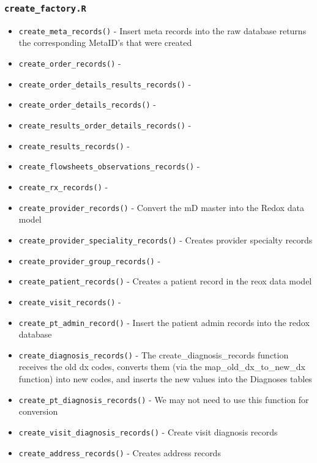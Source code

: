 \documentclass[
]{book}
\providecommand{\tightlist}{%
  \setlength{\itemsep}{0pt}\setlength{\parskip}{0pt}}
\begin{document}
\hypertarget{create_factory.r}{%
\subsubsection{\texorpdfstring{\texttt{create\_factory.R}}{create\_factory.R}}\label{create_factory.r}}

\begin{itemize}
\tightlist
\item
  \texttt{create\_meta\_records()} - Insert meta records into the raw database returns the corresponding MetaID's that were created
\item
  \texttt{create\_order\_records()} -
\item
  \texttt{create\_order\_details\_results\_records()} -
\item
  \texttt{create\_order\_details\_records()} -
\item
  \texttt{create\_results\_order\_details\_records()} -
\item
  \texttt{create\_results\_records()} -
\item
  \texttt{create\_flowsheets\_observations\_records()} -
\item
  \texttt{create\_rx\_records()} -
\item
  \texttt{create\_provider\_records()} - Convert the mD master into the Redox data model
\item
  \texttt{create\_provider\_speciality\_records()} - Creates provider specialty records
\item
  \texttt{create\_provider\_group\_records()} -
\item
  \texttt{create\_patient\_records()} - Creates a patient record in the reox data model
\item
  \texttt{create\_visit\_records()} -
\item
  \texttt{create\_pt\_admin\_record()} - Insert the patient admin records into the redox database
\item
  \texttt{create\_diagnosis\_records()} - The create\_diagnosis\_records function receives the old dx codes, converts them (via the map\_old\_dx\_to\_new\_dx function) into new codes, and inserts the new values into the Diagnoses tables
\item
  \texttt{create\_pt\_diagnosis\_records()} - We may not need to use this function for conversion
\item
  \texttt{create\_visit\_diagnosis\_records()} - Create visit diagnosis records
\item
  \texttt{create\_address\_records()} - Creates address records

\end{itemize}
\end{document}
